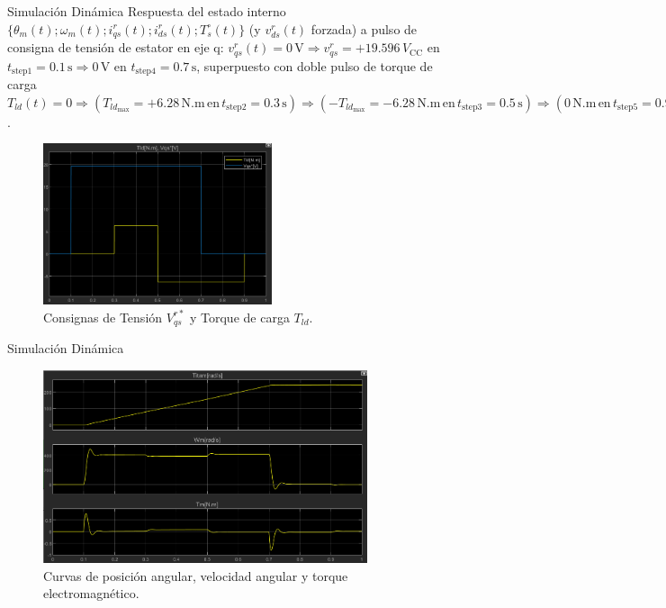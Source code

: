 \documentclass[12pt]{beamer}
\begin{document}
\begin{frame}{Simulación Dinámica} \scriptsize
    Respuesta del estado interno $\{\theta_m(t); \omega_m(t); i_{qs}^r(t); i_{ds}^r(t); T_s^\circ(t)\}$ (y $v_{ds}^r(t)$ forzada) a pulso de consigna de tensión de estator en eje q: $v_{qs}^r(t) = 0\,\text{V} \Rightarrow v_{qs}^r = +19.596\,V_\text{CC}$ en $t_\text{step1} = 0.1\,\text{s} \Rightarrow 0\,\text{V}$ en $t_\text{step4} = 0.7\,\text{s}$, superpuesto con doble pulso de torque de carga $T_{ld}(t) = 0 \Rightarrow (T_{ld}_\text{max} = +6.28\,\text{N.m}\, \text{en}\, t_\text{step2} = 0.3\,\text{s}) \Rightarrow (-T_{ld}_\text{max} = -6.28\,\text{N.m}\, \text{en}\, t_\text{step3} = 0.5\,\text{s}) \Rightarrow (0\,\text{N.m}\, \text{en}\, t_\text{step5} = 0.9\,\text{s})$.

    \begin{figure}[H]
    \centering
    \includegraphics[width=0.6\textwidth]{Imagenes/EntradasTdVq.png}
    \caption{Consignas de Tensión \(V^{r*}_{qs}\) y Torque de carga \(T_{ld}\).}
    \label{fig:EntradasSimulacionDT}
    \end{figure}
\end{frame}

\begin{frame}{Simulación Dinámica}
    \begin{figure}[H]
    \centering
    \includegraphics[width=0.85\textwidth]{Imagenes/VelPosTorqueAlineados.png}
    \caption{Curvas de posición angular, velocidad angular y torque electromagnético.}
    \label{fig:VelPosTorqueAlineados}
\end{figure}
\end{frame}
\end{document}

